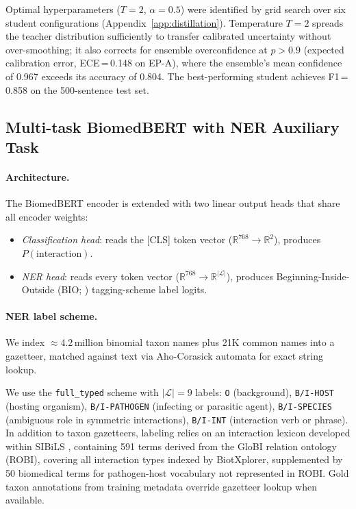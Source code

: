 \documentclass[11pt,twocolumn]{article}
\begin{document}
Optimal hyperparameters ($T{=}2$, $\alpha{=}0.5$) were identified by
grid search over six student configurations (Appendix~\ref{app:distillation}).
Temperature $T{=}2$ spreads the teacher distribution sufficiently to
transfer calibrated uncertainty without over-smoothing; it also corrects
for ensemble overconfidence at $p{>}0.9$ (expected calibration error,
ECE\,=\,0.148 on EP-A),
where the ensemble's mean confidence of 0.967 exceeds its accuracy of 0.804. The best-performing
student achieves F1\,=\,0.858 on the 500-sentence test set.

\subsection{Multi-task BiomedBERT with NER Auxiliary Task}
\label{sec:multitask}

\paragraph{Architecture.}
The BiomedBERT encoder is extended with two linear output heads that share
all encoder weights:
\begin{itemize}
    \item \textit{Classification head}: reads the [CLS] token vector
    ($\mathbb{R}^{768} \to \mathbb{R}^2$), produces $P(\text{interaction})$.
    \item \textit{NER head}: reads every token vector
    ($\mathbb{R}^{768} \to \mathbb{R}^{|\mathcal{L}|}$), produces
    Beginning-Inside-Outside (BIO; \citealt{ramshaw1995text}) tagging-scheme
    label logits.
\end{itemize}

\paragraph{NER label scheme.}
We index $\approx$4.2\,million binomial taxon names plus 21K common
names into a gazetteer, matched against text via Aho-Corasick automata
\citep{aho1975efficient} for exact string lookup.

We use the \texttt{full\_typed} scheme with $|\mathcal{L}| = 9$ labels:
\texttt{O} (background), \texttt{B/I-HOST} (hosting organism),
\texttt{B/I-PATHOGEN} (infecting or parasitic agent),
\texttt{B/I-SPECIES} (ambiguous role in symmetric interactions),
\texttt{B/I-INT} (interaction verb or phrase).
In addition to taxon gazetteers, labeling relies on an interaction lexicon
developed within SIBiLS \citep{mottin2021sibils}, containing 591 terms derived
from the GloBI relation ontology (ROBI), covering all interaction types indexed
by BiotXplorer, supplemented by 50 biomedical terms for pathogen-host vocabulary
not represented in ROBI.
Gold taxon annotations from training metadata override gazetteer lookup when
available.
\end{document}
